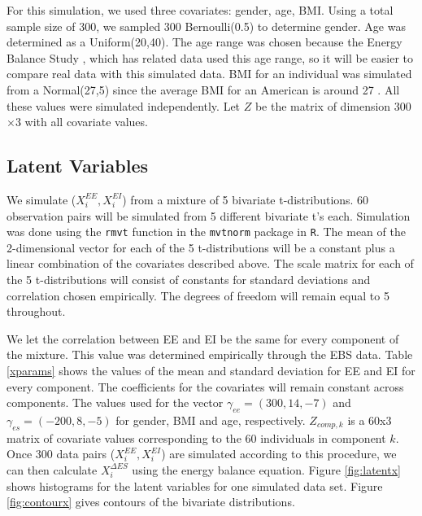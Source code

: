 \documentclass[11pt]{article}\usepackage[]{graphicx}\usepackage[]{color}
\begin{document}
For this simulation, we used three covariates: gender, age, BMI. Using a total sample size of 300, we sampled 300 Bernoulli(0.5) to determine gender. Age was determined as a Uniform(20,40). The age range was chosen because the Energy Balance Study \cite{hand}, which has related data used this age range, so it will be easier to compare real data with this simulated data. BMI for an individual was simulated from a Normal(27,5) since the average BMI for an American is around 27 \cite{cdc}. All these values were simulated independently. Let $Z$ be the matrix of dimension 300$\times$3 with all covariate values.


\subsection{Latent Variables}

We simulate ($X_i^{EE}, X_i^{EI}$) from a mixture of 5 bivariate t-distributions. 60 observation pairs will be simulated from 5 different bivariate t's each. Simulation was done using the \texttt{rmvt} function in the \texttt{mvtnorm} package in \texttt{R}. The mean of the 2-dimensional vector for each of the 5 t-distributions will be a constant plus a linear combination of the covariates described above. The scale matrix for each of the 5 t-distributions will consist of constants for standard deviations and correlation chosen empirically. The degrees of freedom will remain equal to 5 throughout. 


We let the correlation between EE and EI be the same for every component of the mixture. This value was determined empirically through the EBS data. Table \eqref{xparams} shows the values of the mean and standard deviation for EE and EI for every component. The coefficients for the covariates will remain constant across components. The values used for the vector $\gamma_{ee}=(300,14,-7)$ and $\gamma_{es}=(-200,8,-5)$ for gender, BMI and age, respectively. $Z_{comp,k}$ is a 60x3 matrix of covariate values corresponding to the 60 individuals in component $k$.  Once 300 data pairs ($X_i^{EE}, X_i^{EI}$) are simulated according to this procedure, we can then calculate  $X_i^{\Delta ES}$ using the energy balance equation. Figure \ref{fig:latentx} shows histograms for the latent variables for one simulated data set. Figure \ref{fig:contourx} gives contours of the bivariate distributions.
\end{document}
